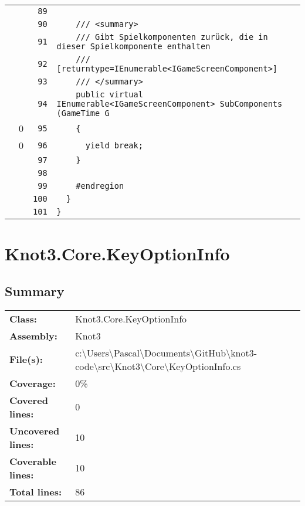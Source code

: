 \documentclass[a4paper,10pt]{article}
\begin{document}
\begin{longtable}[l]{lrrl}
\cellcolor{gray} &  & \verb~89~ & \verb~~\\
\cellcolor{gray} &  & \verb~90~ & \verb~    /// <summary>~\\
\cellcolor{gray} &  & \verb~91~ & \verb~    /// Gibt Spielkomponenten zurück, die in dieser Spielkomponente enthalten ~\\
\cellcolor{gray} &  & \verb~92~ & \verb~    /// [returntype=IEnumerable<IGameScreenComponent>]~\\
\cellcolor{gray} &  & \verb~93~ & \verb~    /// </summary>~\\
\cellcolor{gray} &  & \verb~94~ & \verb~    public virtual IEnumerable<IGameScreenComponent> SubComponents (GameTime G~\\
\cellcolor{red} & 0 & \verb~95~ & \verb~    {~\\
\cellcolor{red} & 0 & \verb~96~ & \verb~      yield break;~\\
\cellcolor{gray} &  & \verb~97~ & \verb~    }~\\
\cellcolor{gray} &  & \verb~98~ & \verb~~\\
\cellcolor{gray} &  & \verb~99~ & \verb~    #endregion~\\
\cellcolor{gray} &  & \verb~100~ & \verb~  }~\\
\cellcolor{gray} &  & \verb~101~ & \verb~}~\\
\end{longtable}
\newpage
\section{Knot3.Core.KeyOptionInfo}
\subsection{Summary}
\begin{longtable}[l]{ll}
\textbf{Class:} & Knot3.Core.KeyOptionInfo\\
\textbf{Assembly:} & Knot3\\
\textbf{File(s):} & \begin{minipage}[t]{12cm}{c:\textbackslash Users\textbackslash Pascal\textbackslash Documents\textbackslash GitHub\textbackslash knot3-code\textbackslash src\textbackslash Knot3\textbackslash Core\textbackslash KeyOptionInfo.cs}\end{minipage} \\
\textbf{Coverage:} & 0\%\\
\textbf{Covered lines:} & 0\\
\textbf{Uncovered lines:} & 10\\
\textbf{Coverable lines:} & 10\\
\textbf{Total lines:} & 86\\
\end{longtable}
\end{document}
